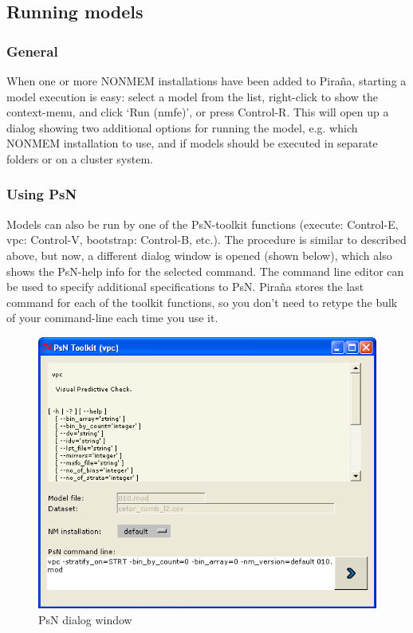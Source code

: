 \documentclass[a4,11pt]{report} \usepackage[pdftex]{graphicx}
\begin{document}
\subsection{Running models}
\subsubsection*{General}
When one or more NONMEM installations have been added to Pira\~na,
starting a model execution is easy: select a model from the list,
right-click to show the context-menu, and click `Run (nmfe)', or press
Control-R. This will open up a dialog showing two additional options
for running the model, e.g. which NONMEM installation to use, and if
models should be executed in separate folders or on a cluster system.

\subsubsection{Using PsN}
Models can also be run by one of the PsN-toolkit functions (execute:
Control-E, vpc: Control-V, bootstrap: Control-B, etc.). The procedure
is similar to described above, but now, a different dialog window is
opened (shown below), which also shows the PsN-help info for the
selected command.  The command line editor can be used to specify
additional specifications to PsN. Pira\~na stores the last command for
each of the toolkit functions, so you don't need to retype the bulk of
your command-line each time you use it.

\begin{figure}[hbt] \centering
    \includegraphics[scale=0.4]{images/psn_dialog.png}
    \caption{PsN dialog window}
\end{figure}
\end{document}
